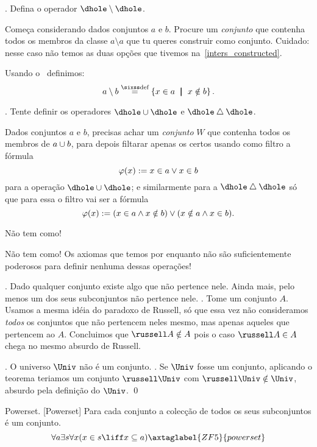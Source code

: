 {%
\exercise.
Defina o operador $\dhole\setminus\dhole$.

\hint
Começa considerando dados conjuntos $a$ e $b$.
Procure um \emph{conjunto} que contenha todos os membros
da classe $a\setminus a$ que tu queres construir como conjunto.
Cuidado: nesse caso não temos as duas opções que tivemos
na~\ref{inters_constructed}.

\solution
Usando o~ definimos:
$$
a\setminus b\defeq \setst {x \in a} {x \notin b}.
$$

\endexercise

\exercise.
\label{cannot_define_union_yet}%
Tente definir os operadores $\dhole\union\dhole$ e $\dhole\symdiff\dhole$.

\hint
Dados conjuntos $a$ e $b$,
precisas achar um \emph{conjunto} $W$
que contenha todos os membros de $a\cup b$,
para depois filtarar apenas os certos usando
como filtro a fórmula
$$
\varphi(x) \mathrel{:=}
x \in a \lor x \in b
$$
para a operação $\dhole\union\dhole$;
e similarmente para a $\dhole\symdiff\dhole$ só que
para essa o filtro vai ser a fórmula
$$
\varphi(x)\mathrel{:=}
{\left({x \in a \land x \notin b}\right)}
\lor
{\left({x \notin a \land x \in b}\right)}.
$$

\hint
Não tem como!

\solution
Não tem como!
Os axiomas que temos por enquanto não são suficientemente poderosos para
definir nenhuma dessas operações!

\endexercise

\theorem.
\label{russells_paradox_to_theorem}%
Dado qualquer conjunto existe algo que não pertence nele.
Ainda mais, pelo menos um dos seus subconjuntos não pertence nele.
\sketch.
Tome um conjunto $A$.
Usamos a mesma idéia do paradoxo de Russell,
só que essa vez não consideramos \emph{todos} os conjuntos que não
pertencem neles mesmo, mas apenas aqueles que pertencem ao $A$.
Concluimos que $\russell A \notin A$ pois o caso $\russell A \in A$ chega 
no mesmo absurdo de Russell.
\qes

\corollary.
\label{Univ_is_not_a_set}%
O universo $\Univ$ não é um conjunto.
\proof.
Se $\Univ$ fosse um conjunto, aplicando o teorema teriamos um conjunto $\russell \Univ$
com $\russell\Univ \notin \Univ$, absurdo pela definição do $\Univ$.
\qed

\axiom Powerset.
[Powerset]%
\label{powerset}%
Para cada conjunto a colecção de todos os seus subconjuntos é um conjunto.
$$
\forall a
\exists s
\forall x
\paren{
x\in s
\liff
x \subseteq a
}
\axtaglabel{ZF5}{powerset}
$$

}

